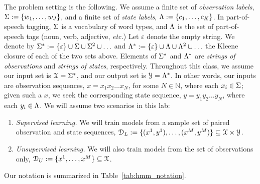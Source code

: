 The problem setting is the following. 
We assume a finite set of \emph{observation labels}, 
$\Sigma := \{w_1,\ldots,w_J\}$,
and a finite set of \emph{state labels}, 
$\Lambda := \{c_1,\ldots, c_K\}$.
In part-of-speech tagging, $\Sigma$ is a 
vocabulary of word types, and 
$\Lambda$ is the set of part-of-speech tags 
(noun, verb, adjective, \emph{etc.})
Let $\varepsilon$ denote the empty string. 
We denote by 
$\Sigma^* := \{\varepsilon\} \cup \Sigma \cup \Sigma^2 \cup \ldots$ and 
$\Lambda^* := \{\varepsilon\} \cup \Lambda \cup \Lambda^2  \cup \ldots$ the Kleene closure 
of each of the two sets above. 
Elements of $\Sigma^*$ and $\Lambda^*$ 
are \emph{strings of observations} and \emph{strings of states}, 
respectively. 
Throughout this class, we 
assume our input set is $\mathcal{X} = \Sigma^*$, 
and our output set is $\mathcal{Y} = \Lambda^*$. 
In other words, 
our inputs are observation sequences, 
$x = x_1 x_2 \ldots x_N$, 
for some $N \in \mathbb{N}$, where each $x_i \in \Sigma$;
given such a $x$, we seek 
the corresponding state sequence, 
$y = y_1 y_2 \ldots y_N$, 
where each $y_i \in \Lambda$.
We will assume two scenarios in this lab:
\begin{enumerate}
\item \emph{Supervised learning.} We will 
train models from a sample set of paired observation and state sequences, $\mathcal{D}_L := \{(x^1,y^1), \ldots, (x^M,y^M)\} \subseteq \mathcal{X} \times \mathcal{Y}$.
\item \emph{Unsupervised learning.} We will also
train models from the set of observations only, $\mathcal{D}_U := \{x^1, \ldots, x^M\} \subseteq \mathcal{X}$.
\end{enumerate}
Our notation is summarized in Table~\ref{tab:hmm_notation}.

%

